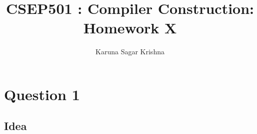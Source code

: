 \documentclass{article}
\title{CSEP501 : Compiler Construction: Homework X}
\author{Karuna Sagar Krishna}
\begin{document}
    \maketitle

    \section*{Question 1}

    \subsection*{Idea}
\end{document}
